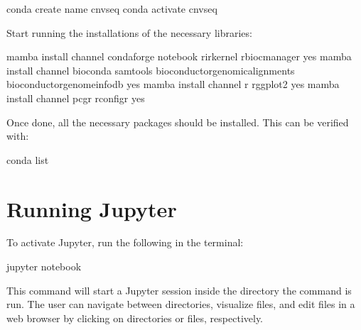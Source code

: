 \documentclass[letterpaper,10pt,english]{sphinxhowto}
\begin{document}
\begin{sphinxVerbatim}[commandchars=\\\{\}]
\PYGZdl{} conda create \PYGZhy{}\PYGZhy{}name cnvseq
\PYGZdl{} conda activate cnvseq
\end{sphinxVerbatim}

\sphinxAtStartPar
Start running the installations of the necessary libraries:

\begin{sphinxVerbatim}[commandchars=\\\{\}]
\PYGZdl{} mamba install \PYGZhy{}\PYGZhy{}channel conda\PYGZhy{}forge notebook r\PYGZhy{}irkernel r\PYGZhy{}biocmanager \PYGZhy{}\PYGZhy{}yes
\PYGZdl{} mamba install \PYGZhy{}\PYGZhy{}channel bioconda samtools bioconductor\PYGZhy{}genomicalignments bioconductor\PYGZhy{}genomeinfodb \PYGZhy{}\PYGZhy{}yes
\PYGZdl{} mamba install \PYGZhy{}\PYGZhy{}channel r r\PYGZhy{}ggplot2 \PYGZhy{}\PYGZhy{}yes
\PYGZdl{} mamba install \PYGZhy{}\PYGZhy{}channel pcgr r\PYGZhy{}configr \PYGZhy{}\PYGZhy{}yes
\end{sphinxVerbatim}

\sphinxAtStartPar
Once done, all the necessary packages should be installed. This can be verified with:

\begin{sphinxVerbatim}[commandchars=\\\{\}]
\PYGZdl{} conda list
\end{sphinxVerbatim}


\section{Running Jupyter}
\label{\detokenize{index:running-jupyter}}
\sphinxAtStartPar
To activate Jupyter, run the following in the terminal:

\begin{sphinxVerbatim}[commandchars=\\\{\}]
\PYGZdl{} jupyter notebook
\end{sphinxVerbatim}

\sphinxAtStartPar
This command will start a Jupyter session inside the directory the command is run. The user can navigate between directories, visualize files, and edit files in a web browser by clicking on directories or files, respectively.
\end{document}

